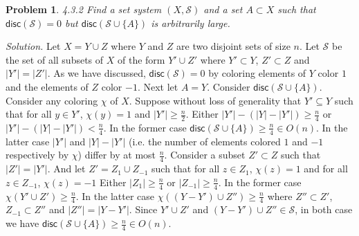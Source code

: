 \documentclass[11pt]{article}
\newcommand\disc{\mathsf{disc}}
\newcommand\SSet{\mathcal{S}}
\newtheorem{problem}{Problem}
\begin{document}
\pagebreak
\begin{problem}
4.3.2 Find a set system $(X, \SSet)$ and a set $A \subset X$ such that $\disc(\SSet) = 0$ but $\disc(\SSet \cup \{A\})$ is arbitrarily large.
\end{problem}
\emph{Solution.}
Let $X = Y \cup Z$ where $Y$ and $Z$ are two disjoint sets of size $n$. Let $\SSet$ be the set of all subsets of $X$ of the form $Y' \cup Z'$ where $Y' \subset Y$, $Z' \subset Z$ and $|Y'| = |Z'|$. As we have discussed, $\disc(\SSet) = 0$ by coloring elements of $Y$ color $1$ and the elements of $Z$ color $-1$. Next let $A = Y$. Consider $\disc(\SSet \cup \{A\})$. Consider any coloring $\chi$ of $X$. Suppose without loss of generality that $Y' \subseteq Y$ such that for all $y \in Y'$, $\chi(y) = 1$ and $|Y'| \geq \frac{n}{2}$. Either $|Y'| - (|Y| - |Y'|) \geq \frac{n}{4}$ or $|Y'| - (|Y| - |Y'|) < \frac{n}{4}$. In the former case $\disc(\SSet \cup \{A\}) \geq \frac{n}{4} \in O(n)$. In the latter case $|Y'|$ and $|Y| - |Y'|$ (i.e. the number of elements colored $1$ and $-1$ respectively by $\chi$) differ by at most $\frac{n}{4}$. Consider a subset $Z' \subset Z$ such that $|Z'| = |Y'|$. And let $Z' = Z_{1} \cup Z_{-1}$ such that for all $z \in Z_{1}$, $\chi(z) = 1$ and for all $z \in Z_{-1}$, $\chi(z) = -1$ Either $|Z_1| \geq \frac{n}{4}$ or $|Z_{-1}| \geq \frac{n}{4}$. In the former case $\chi(Y' \cup Z') \geq \frac{n}{4}$. In the latter case $\chi((Y - Y') \cup Z'') \geq \frac{n}{4}$ where $Z'' \subset Z'$, $Z_{-1} \subset Z''$ and $|Z''| = |Y - Y'|$. Since $Y' \cup Z'$ and $(Y-Y') \cup Z'' \in \SSet$, in both case we have $\disc(\SSet \cup \{A\}) \geq \frac{n}{4} \in O(n)$.
\end{document}

